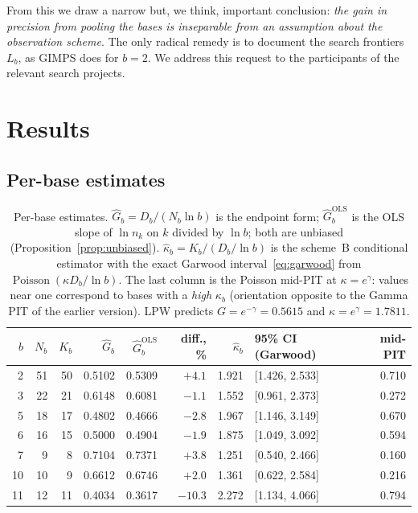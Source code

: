 \documentclass[11pt,a4paper]{article}
\theoremstyle{plain}
\theoremstyle{remark}
\newcommand{\eg}{e^{\gamma}}
\newcommand{\emg}{e^{-\gamma}}
\DeclareMathOperator{\Pois}{Poisson}
\begin{document}
From this we draw a narrow but, we think, important conclusion: \emph{the gain
in precision from pooling the bases is inseparable from an assumption about the
observation scheme}. The only radical remedy is to document the search frontiers
$L_b$, as GIMPS does for $b=2$. We address this request to the participants of
the relevant search projects.

\section{Results}\label{sec:results}

\subsection{Per-base estimates}

\begin{table}[t]
\centering
\caption{Per-base estimates. $\hat G_b=D_b/(N_b\ln b)$ is the endpoint form;
$\hat G_b^{\mathrm{OLS}}$ is the OLS slope of $\ln n_k$ on $k$ divided by $\ln b$;
both are unbiased (Proposition~\ref{prop:unbiased}).
$\hat\kappa_b=K_b/(D_b/\ln b)$ is the scheme~B conditional estimator with the
exact Garwood interval~\eqref{eq:garwood} from $\Pois(\kappa D_b/\ln b)$. The last
column is the Poisson mid-PIT at $\kappa=\eg$: values near one correspond to bases
with a \emph{high} $\kappa_b$ (orientation opposite to the Gamma PIT of the earlier
version). LPW predicts $G=\emg=0.5615$ and $\kappa=\eg=1.7811$.}
\label{tab:bases}
\small
\begin{tabular}{rrrrrrrl r}
\toprule
$b$ & $N_b$ & $K_b$ & $\hat G_b$ & $\hat G_b^{\mathrm{OLS}}$ & diff., \% &
$\hat\kappa_b$ & 95\% CI (Garwood) & mid-PIT\\
\midrule
2 & 51 & 50 & 0.5102 & 0.5309 & $+4.1$ & 1.921 & [1.426, 2.533] & 0.710\\
3 & 22 & 21 & 0.6148 & 0.6081 & $-1.1$ & 1.552 & [0.961, 2.373] & 0.272\\
5 & 18 & 17 & 0.4802 & 0.4666 & $-2.8$ & 1.967 & [1.146, 3.149] & 0.670\\
6 & 16 & 15 & 0.5000 & 0.4904 & $-1.9$ & 1.875 & [1.049, 3.092] & 0.594\\
7 & 9 & 8 & 0.7104 & 0.7371 & $+3.8$ & 1.251 & [0.540, 2.466] & 0.160\\
10 & 10 & 9 & 0.6612 & 0.6746 & $+2.0$ & 1.361 & [0.622, 2.584] & 0.216\\
11 & 12 & 11 & 0.4034 & 0.3617 & $-10.3$ & 2.272 & [1.134, 4.066] & 0.794\\

\end{tabular}
\end{table}
\end{document}
